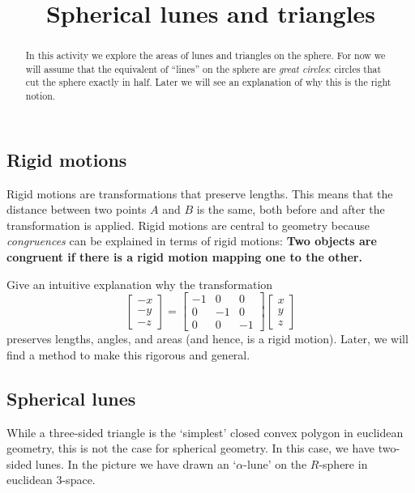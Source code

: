 \documentclass[newpage,hints,12pt,handout,nooutcomes,noauthor]{ximera}
\title{Spherical lunes and triangles}
\begin{document}
\begin{abstract}
In this activity we explore the areas of lunes and triangles on the sphere.
For now we will assume that the equivalent of ``lines'' on the sphere are
\emph{great circles}: circles that cut the sphere exactly in half.  Later we will
see an explanation of why this is the right notion.
\end{abstract}
\maketitle

\subsection{Rigid motions}


Rigid motions are transformations that preserve lengths. This
means that the distance between two points $A$ and $B$ is the same,
both before and after the transformation is applied. Rigid motions are
central to geometry because \textit{congruences} can be explained in
terms of rigid motions: \textbf{Two objects are congruent if there is a rigid
motion mapping one to the other.} 



\begin{problem}
  Give an intuitive explanation why the transformation
  \[
  \begin{bmatrix}-x\\-y\\-z\end{bmatrix}=
    \begin{bmatrix}
      -1 & 0 & 0\\
      0 & -1 & 0\\
      0 & 0 & -1
    \end{bmatrix}
    \begin{bmatrix}x\\y\\z\end{bmatrix}
  \]
  preserves lengths, angles, and areas (and hence, is a rigid
  motion). Later, we will find a method to make this rigorous and
  general.
\end{problem}




\subsection{Spherical lunes}
While a three-sided triangle is the `simplest' closed convex polygon
in euclidean geometry, this is not the case for spherical geometry. In
this case, we have two-sided lunes.  In the picture we have drawn an
`$\alpha$-lune' on the $R$-sphere in euclidean $3$-space.
\end{document}
